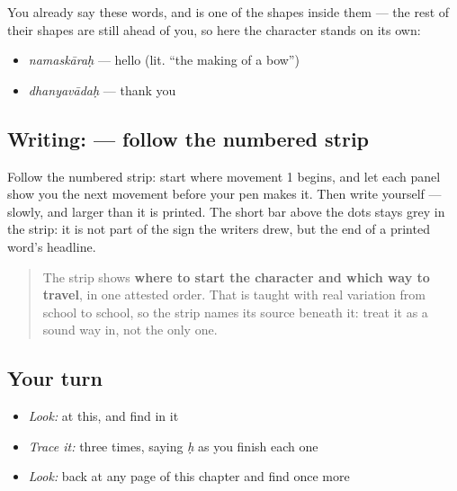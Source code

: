 You already say these words, and  is one of the shapes inside them — the rest of their shapes are still ahead of you, so here the character stands on its own:

\begin{itemize}
\raggedright
  \item \emph{namaskāraḥ} — hello (lit. \textquotedblleft{}the making of a bow\textquotedblright{})
  \item \emph{dhanyavādaḥ} — thank you
\end{itemize}

\subsection*{Writing:  — follow the numbered strip}

Follow the numbered strip: start where movement 1 begins, and let each panel show you the next movement before your pen makes it. Then write  yourself — slowly, and larger than it is printed. The short bar above the dots stays grey in the strip: it is not part of the sign the writers drew, but the end of a printed word's headline.

\begin{quote}
The strip shows \textbf{where to start the character and which way to travel}, in one attested order. That is taught with real variation from school to school, so the strip names its source beneath it: treat it as a sound way in, not the only one.
\end{quote}

\subsection*{Your turn}
\begin{itemize}
\raggedright
  \item \emph{Look:} at this, and find  in it
\end{itemize}

\begin{quote}
\end{quote}

\begin{itemize}
\raggedright
  \item \emph{Trace it:}  three times, saying \emph{ḥ} as you finish each one
  \item \emph{Look:} back at any page of this chapter and find  once more
\end{itemize}


